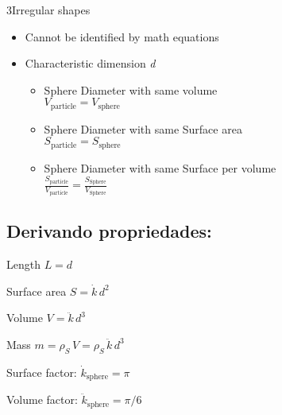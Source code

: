 \documentclass[\mainfilename]{subfiles}
\begin{document}
\begin{sectionBox}3{Irregular shapes} %
    \begin{itemize}
        \item Cannot be identified by math equations
        \item Characteristic dimension \textit{d}
        \begin{itemize}
            \item Sphere Diameter with same volume 
            \\\(V_{\text{particle}}=V_{\text{sphere}}\)
            \item Sphere Diameter with same Surface area
            \\\(S_{\text{particle}}=S_{\text{sphere}}\)
            \item Sphere Diameter with same Surface per volume
            \\\(
                \frac
                {S_{\text{particle}}}
                {V_{\text{particle}}}
                = \frac
                {S_{\text{Sphere}}}
                {V_{\text{Sphere}}}
            \)
        \end{itemize}
    \end{itemize}
    \subsection*{Derivando propriedades:}
    \begin{description}[
        leftmargin=!,
        labelwidth=\widthof{Surface area} %
    ]
        \begin{multicols}{2}
            \item[Length] \(L=d\)
            \item[Surface area] \(S=\dot{k}\,d^2\)
            \item[Volume] \(V=\ddot{k}\,d^3\)
            \item[Mass] \(m=\rho_S\,V=\rho_S\,\ddot{k}\,d^3\)
        \end{multicols}
    \end{description}
    \begin{itemize}
        \begin{multicols}{2}
            \item Surface factor: \(\dot{k}_{\text{sphere}}=\pi\)
            \item Volume factor: \(\ddot{k}_{\text{sphere}}=\pi/6\)
        \end{multicols}
    \end{itemize}

\end{sectionBox}
\end{document}

